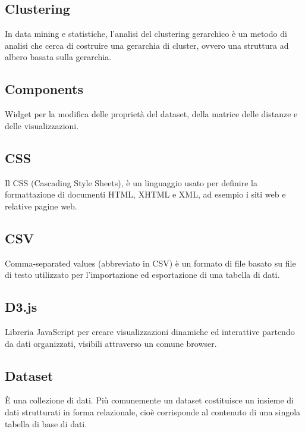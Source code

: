 \documentclass[../manuale_sviluppatore.tex]{subfiles}
\begin{document}
\subsection*{Clustering}
{}
In data mining e statistiche, l'analisi del clustering gerarchico è un metodo di analisi che cerca 
di costruire una gerarchia di cluster, ovvero una struttura ad albero basata sulla gerarchia.

\subsection*{Components}
{}
Widget per la modifica delle proprietà del dataset, della matrice delle distanze e delle 
visualizzazioni.

\subsection*{CSS}
{}
Il CSS (Cascading Style Sheets), è un linguaggio usato per definire la formattazione di documenti 
HTML, XHTML e XML, ad esempio i siti web e relative pagine web.

\subsection*{CSV}
{}
Comma-separated values (abbreviato in CSV) è un formato di file basato su file di testo utilizzato 
per l'importazione ed esportazione di una tabella di dati.

\subsection*{D3.js}
{}
Libreria JavaScript per creare visualizzazioni dinamiche ed interattive partendo da dati 
organizzati, visibili attraverso un comune browser.

\subsection*{Dataset}
{}
È una collezione di dati. Più comunemente un dataset costituisce un insieme di dati strutturati in 
forma relazionale, cioè corrisponde al contenuto di una singola tabella di base di dati.
\end{document}
